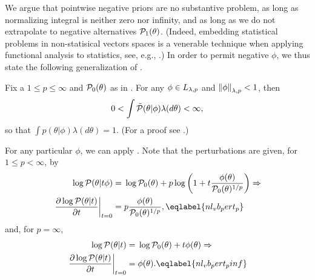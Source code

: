 We argue that pointwise negative priors are no substantive problem, as long as
normalizing integral is neither zero nor infinity, and as long as we do not
extrapolate to negative alternatives $\mathcal{P}_{1}(\theta)$.  (Indeed, embedding
statistical problems in non-statisical vectors spaces is a venerable technique
when applying functional analysis to statistics, see, e.g., \citet[Chapter
6]{serfling:2009:approximation}.)  In order to permit negative $\phi$, we thus
state the following generalization of \citep[Result 2]{gustafson:1996:local}.


\begin{lem}
%
Fix a $1 \le p \le \infty$ and $\mathcal{P}_{0}(\theta)$ as in .
For any $\phi \in {L_{\lambda,p}}$ and $\left\Vert\phi\right\Vert_{\lambda,p} < 1$, then
%
\begin{align*}
%
0 < \int \tilde{\p}(\theta \vert \phi) \lambda(d\theta) < \infty,
%
\end{align*}
%
so that $\int p(\theta \vert \phi) \lambda(d\theta) = 1$.
%
(For a proof see  .)
%
\end{lem}



For any particular $\phi$, we can apply .  Note that the
perturbations are given, for $1 \le p < \infty$, by
%
\begin{align}
%
\logp(\theta \vert \t \phi) ={}&
   \log \pbase(\theta) +
       p \log\left(1 + \t \frac{\phi(\theta)}{\pbase(\theta)^{1/p}}\right)
\Rightarrow \nonumber\\
\fracat{\partial \log \p(\theta \vert \t)}{\partial \t}{\t=0} ={}&
   p \frac{\phi(\theta)}{\pbase(\theta)^{1/p}},
   \eqlabel{nl_vb_pert_p}
%
\end{align}
%
and, for $p = \infty$,
%
\begin{align}
%
\logp(\theta \vert \t) ={}&
   \log \pbase(\theta) + \t \phi(\theta)
\Rightarrow \nonumber\\
\fracat{\partial \log \p(\theta \vert \t)}{\partial \t}{\t=0} ={}&
   \phi(\theta).
\eqlabel{nl_vb_pert_pinf}
%
\end{align}


